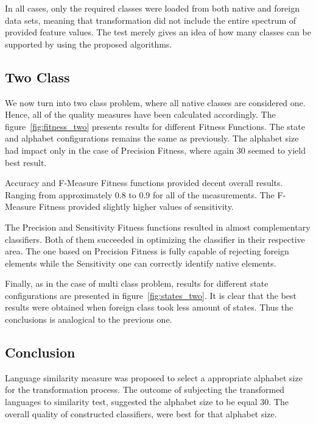 \documentclass{mini}
\begin{document}
In all cases, only the required classes were loaded from both native and foreign data sets, meaning that transformation did not include the entire spectrum of provided feature values. The test merely gives an idea of how many classes can be supported by using the proposed algorithms.

\makeFigurePSOClasses

\subsection{Two Class}

We now turn into two class problem, where all native classes are considered one. Hence, all of the quality measures have been calculated accordingly.
The figure~\ref{fig:fitness_two} presents results for different Fitness Functions. The state and alphabet configurations remains the same as previously. The alphabet size had impact only in the case of Precision Fitness, where again $30$ seemed to yield best result.

Accuracy and F-Measure Fitness functions provided decent overall results. Ranging from approximately $0.8$ to $0.9$ for all of the measurements. The F-Measure Fitness provided slightly higher values of sensitivity.

The Precision and Sensitivity Fitness functions resulted in almost complementary classifiers. Both of them succeeded in optimizing the classifier in their respective area. The one based on Precision Fitness is fully capable of rejecting foreign elements while the Sensitivity one can correctly identify native elements.


\makeFigureFitnessTwo

Finally, as in the case of multi class problem, results for different state configurations are presented in figure~\ref{fig:states_two}. It is clear that the best results were obtained when foreign class took less amount of states. Thus the conclusions is analogical to the previous one.

\makeFigureStatesTwo

\subsection{Conclusion}

Language similarity measure was proposed to select a appropriate alphabet size for the transformation process. The outcome of subjecting the transformed languages to similarity test, suggested the alphabet size to be equal $30$. The overall quality of constructed classifiers, were best for that alphabet size.
\end{document}
